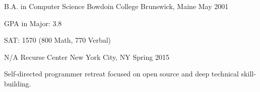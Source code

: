 \documentclass[11pt, a4paper]{awesome-cv}
\begin{document}
\makecvheader

\begin{cventries}
  \cventry
    {B.A. in Computer Science}
    {Bowdoin College}
    {Brunswick, Maine}
    {May 2001}
    {
      \begin{cvitems}
        \item GPA in Major: 3.8
        \item SAT: 1570 (800 Math, 770 Verbal)
      \end{cvitems}
    }
  \cventry
    {N/A}
    {Recurse Center}
    {New York City, NY}
    {Spring 2015}
    {
      \begin{cvitems}
        \item Self-directed programmer retreat focused on open source and deep technical skill-building.
      \end{cvitems}
    }
\end{cventries}

\begin{cvskills}
\end{cvskills}
\end{document}
